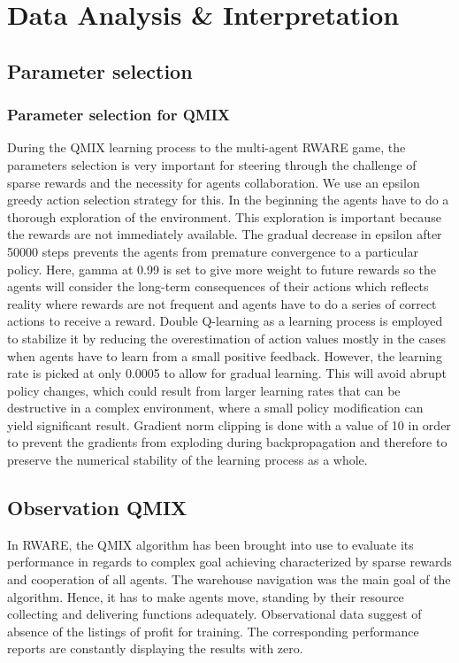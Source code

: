 \documentclass[11pt]{article}
\begin{document}
\section{Data Analysis \& Interpretation}\label{discussion}
\subsection{Parameter selection} 
\subsubsection{Parameter selection for QMIX} 
During the QMIX learning process to the multi-agent RWARE game, the parameters selection is very important for steering through the challenge of sparse rewards and the necessity for agents collaboration. We use an epsilon greedy action selection strategy for this. In the beginning the agents have to do a thorough exploration of the environment. This exploration is important because the rewards are not immediately available. The gradual decrease in epsilon after 50000 steps prevents the agents from premature convergence to a particular policy. Here, gamma at 0.99 is set to give more weight to future rewards so the agents will consider the long-term consequences of their actions which reflects reality where rewards are not frequent and agents have to do a series of correct actions to receive a reward.
Double Q-learning as a learning process is employed to stabilize it by reducing the overestimation of action values mostly in the cases when agents have to learn from a small positive feedback. However, the learning rate is picked at only 0.0005 to allow for gradual learning. This will avoid abrupt policy changes, which could result from larger learning rates that can be destructive in a complex environment, where a small policy modification can yield significant result. Gradient norm clipping is done with a value of 10 in order to prevent the gradients from exploding during backpropagation and therefore to preserve the numerical stability of the learning process as a whole.
\subsection{Observation QMIX} 
In RWARE, the QMIX algorithm has been brought into use to evaluate its performance in regards to complex goal achieving characterized by sparse rewards and cooperation of all agents. The warehouse navigation was the main goal of the algorithm. Hence, it has to make agents move, standing by their resource collecting and delivering functions adequately. Observational data suggest of absence of the listings of profit for training. The corresponding performance reports are constantly displaying the results with zero.
\end{document}
